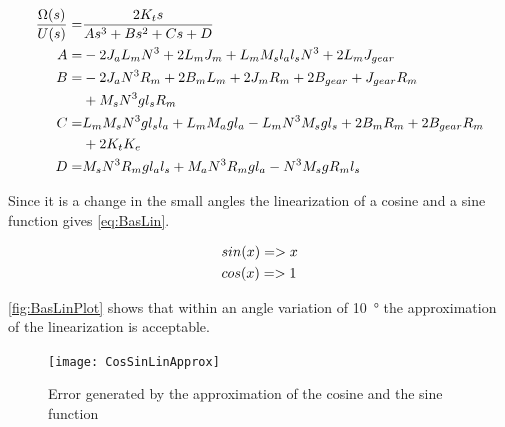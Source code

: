 \begin{subequations}\label{eq:TfMotor}
	\begin{align}
		\frac{\Omega(s)}{U(s)}=&\frac{2 K_t s}{A s^3+B s^2+C s+ D} \addunit{1}\\
		A=& -2 J_a L_m N^3+2 L_m J_m+L_m M_s l_a l_s N^3+2 L_m J_{gear}\\
		B=&-2 J_a N^3 R_m+2 B_m L_m+2 J_m R_m +2 B_{gear} + J_{gear} R_m \notag \\
		&+M_s N^3 g l_s R_m \\
		C=&L_m M_s N^3 g l_s l_a + L_m M_a g l_a - L_m N^3 M_s g l_s+2 B_m R_m+2 B_{gear} R_m \notag\\
		&+2 K_t K_e\\
		D=&M_s N^3 R_m g l_a l_s +M_a N^3 R_m g l_a -N^3 M_s g R_m l_s	
	\end{align}
\end{subequations}

Since it is a change in the small angles the linearization of a cosine and a sine function gives \autoref{eq:BasLin}.

\begin{subequations}\label{eq:BasLin}
	\begin{flalign}
		&sin(x)=>x \addunit{1}\\
		&cos(x)=>1 \addunit{1}
	\end{flalign}
\end{subequations}

\autoref{fig:BasLinPlot} shows that within an angle variation of \SI{10}{\degree} the approximation of the linearization is acceptable.

\begin{figure}[htbp]
	\centering
	\texttt{[image: CosSinLinApprox]}
	\caption{Error generated by the approximation of the cosine and the sine function}\label{fig:BasLinPlot}
\end{figure}


